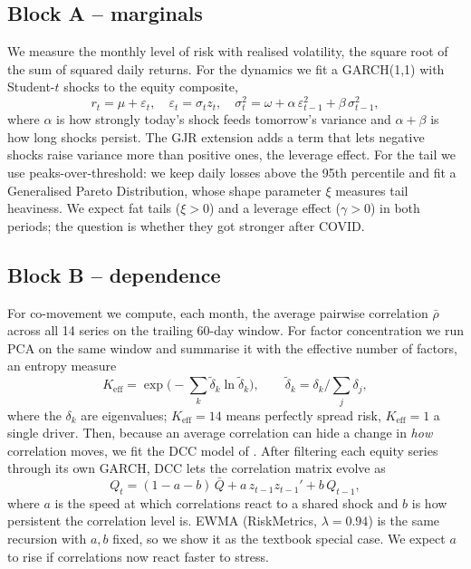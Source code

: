 \documentclass[11pt,a4paper]{article}
\newcommand{\rhobar}{\bar{\rho}}
\newcommand{\Keff}{K_{\text{eff}}}
\begin{document}
\subsection{Block A -- marginals}

We measure the monthly level of risk with realised volatility, the square root of the sum of squared
daily returns. For the dynamics we fit a GARCH(1,1) with Student-$t$ shocks to the equity composite,
\begin{equation}
r_t = \mu + \varepsilon_t,\quad \varepsilon_t = \sigma_t z_t,\quad
\sigma_t^2 = \omega + \alpha\,\varepsilon_{t-1}^2 + \beta\,\sigma_{t-1}^2 ,
\end{equation}
where $\alpha$ is how strongly today's shock feeds tomorrow's variance and $\alpha+\beta$ is how long
shocks persist. The GJR extension adds a term that lets negative shocks raise variance more than positive
ones, the leverage effect. For the tail we use peaks-over-threshold: we keep daily losses above the 95th
percentile and fit a Generalised Pareto Distribution, whose shape parameter $\xi$ measures tail
heaviness. We expect fat tails ($\xi>0$) and a leverage effect ($\gamma>0$) in both periods; the question
is whether they got stronger after COVID.

\subsection{Block B -- dependence}

For co-movement we compute, each month, the average pairwise correlation $\rhobar$ across all 14 series
on the trailing 60-day window. For factor concentration we run PCA on the same window and summarise it
with the effective number of factors, an entropy measure
\begin{equation}
\Keff = \exp\!\Big(-\textstyle\sum_k \tilde\delta_k \ln \tilde\delta_k\Big),\qquad
\tilde\delta_k = \delta_k/\textstyle\sum_j \delta_j ,
\end{equation}
where the $\delta_k$ are eigenvalues; $\Keff=14$ means perfectly spread risk, $\Keff=1$ a single driver.
Then, because an average correlation can hide a change in \emph{how} correlation moves, we fit the DCC
model of \citet{engle2002}. After filtering each equity series through its own GARCH, DCC lets the
correlation matrix evolve as
\begin{equation}
Q_t = (1-a-b)\,\bar Q + a\,z_{t-1}z_{t-1}' + b\,Q_{t-1},
\end{equation}
where $a$ is the speed at which correlations react to a shared shock and $b$ is how persistent the
correlation level is. EWMA (RiskMetrics, $\lambda=0.94$) is the same recursion with $a,b$ fixed, so we
show it as the textbook special case. We expect $a$ to rise if correlations now react faster to stress.
\end{document}
